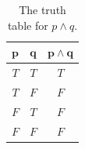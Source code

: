 \begin{table}[h]
    \centering
    \begin{tabular}{|c|c||c|}
        \hline $\mathbf{p}$ & $\mathbf{q}$ & $\mathbf{p \land q}$ \\
        \hline \cellcolor{green!25}$T$ & \cellcolor{green!25}$T$ & \cellcolor{green!25}$T$ \\
        \hline \cellcolor{green!25}$T$ & \cellcolor{red!25}$F$ & \cellcolor{red!25}$F$ \\
        \hline \cellcolor{red!25}$F$ & \cellcolor{green!25}$T$ & \cellcolor{red!25}$F$ \\
        \hline \cellcolor{red!25}$F$ & \cellcolor{red!25}$F$ & \cellcolor{red!25}$F$ \\
        \hline
    \end{tabular}
        \caption{The truth table for $p \land q$.}
        \label{tab:conjtab}
\end{table}